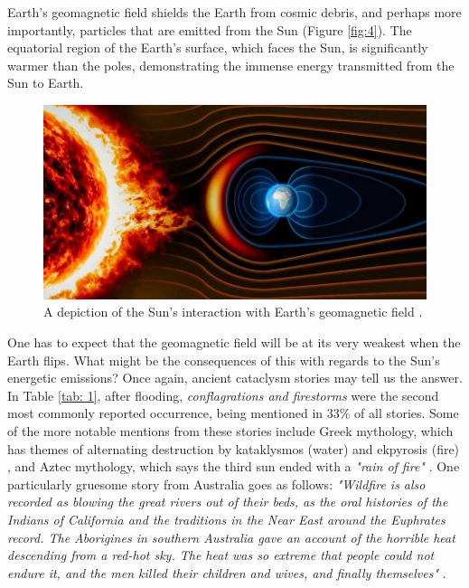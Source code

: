 \documentclass[10pt,twocolumn,letterpaper]{article}
\begin{document}
Earth's geomagnetic field shields the Earth from cosmic debris, and perhaps more importantly, particles that are emitted from the Sun (Figure \ref{fig:4}). The equatorial region of the Earth's surface, which faces the Sun, is significantly warmer than the poles, demonstrating the immense energy transmitted from the Sun to Earth.

\begin{figure}[t]
\begin{center}
   \includegraphics[width=1\linewidth]{solargeo.jpg}
\end{center}
   \caption{A depiction of the Sun's interaction with Earth's geomagnetic field \cite{10}.}
\label{fig:4}
\label{fig:onecol}
\end{figure}

One has to expect that the geomagnetic field will be at its very weakest when the Earth flips. What might be the consequences of this with regards to the Sun's energetic emissions? Once again, ancient cataclysm stories may tell us the answer. In Table \ref{tab: 1}, after flooding, \textit{conflagrations and firestorms} were the second most commonly reported occurrence, being mentioned in 33\% of all stories. Some of the more notable mentions from these stories include Greek mythology, which has themes of alternating destruction by kataklysmos (water) and ekpyrosis (fire) \cite{13}, and Aztec mythology, which says the third sun ended with a \textit{"rain of fire"} \cite{14}. One particularly gruesome story from Australia goes as follows: \textit{"Wildfire is also recorded as blowing the great rivers out of their beds, as the oral histories of the Indians of California and the traditions in the Near East around the Euphrates record. The Aborigines in southern Australia gave an account of the horrible heat descending from a red-hot sky. The heat was so extreme that people could not endure it, and the men killed their children and wives, and finally themselves"} \cite{15}.
\end{document}
